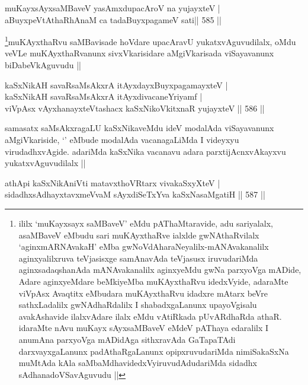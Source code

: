 \begin{shl}
muKayxsAyxsaMBaveV yasAmxdupacAroV na yujayxteV | \\
aBuyxpeVtAthaRhAnaM ca tadaBuyxpagameV sati\hfill ||  585 ||  
\end{shl}

\begin{artha}
\footnote{ililx `muKayxsayx saMBaveV' eMdu pAThaMtaravide, adu sariyalalx, asaMBaveV eMbudu sari muKAyxthaRve ialxlde gwNAthaRvilalx `aginxmARNAvakaH' eMba gwNoVdAharaNeyalilx-mANAvakanalilx aginxyalilxruva teVjasisxge samAnavAda teVjasusx iruvudariMda aginxsadaqshanAda mANAvakanalilx aginxyeMdu gwNa parxyoVga mADide, Adare aginxyeMdare beMkiyeMba muKAyxthaRvu idedxVyide, adaraMte viVpAsx Avaqtitx eMbudara muKAyxthaRvu idadxre mAtarx beVre sathxLadalilx gwNAdhaRdalilx I shabadxgaLanunx upayoVgisalu avakAshavide ilalxvAdare ilalx eMdu vAtiRkada pUvARdhaRda athaR. idaraMte nAvu muKayx sAyxsaMBaveV eMdeV pAThaya edaralilx I anumAna parxyoVga mADidAga sithxravAda GaTapaTAdi darxvayxgaLanunx padAthaRgaLanunx opipxruvudariMda nimiSakaSxNa muMtAda kAla saMbaMdhavidedxVyiruvudAdudariMda sidadhx sAdhanadoVSavAguvudu ||}muKAyxthaRvu saMBavisade hoVdare upacAravU yukatxvAguvudilalx, oMdu veVLe muKAyxthaRvanunx sivxVkarisidare aMgiVkarisada viSayavanunx biDabeVkAguvudu ||
\end{artha}


\begin{shl}
kaSxNikAH  savaRsaMsAkxrA itAyxdayxBuyxpagamayxteV | \\
kaSxNikAH  savaRsaMsAkxrA itAyxdivacaneYriyamf | \\
viVpAsx vAyxhanayxteV\s tashacx kaSxNikoVkitxnaR yujayxteV \hfill||  586 ||  
\end{shl}

\begin{artha}
samasatx saMsAkxragaLU kaSxNikaveMdu ideV modalAda viSayavanunx aMgiVkariside, `\stext' eMbude modalAda vacanagaLiMda I videyxyu virudadhxvAgide. adariMda kaSxNika vacanavu adara parxtijAcnxvAkayxvu yukatxvAguvudilalx ||
\end{artha}

\begin{shl}
athApi kaSxNikAniVti matavxthoVR\s tarx vivakaSxyXteV | \\
sidadhxsAdhayxtavxmeVvaM sAyxdiSeTxYva kaSxNasaMgatiH \hfill||  587 ||  
\end{shl}
				
